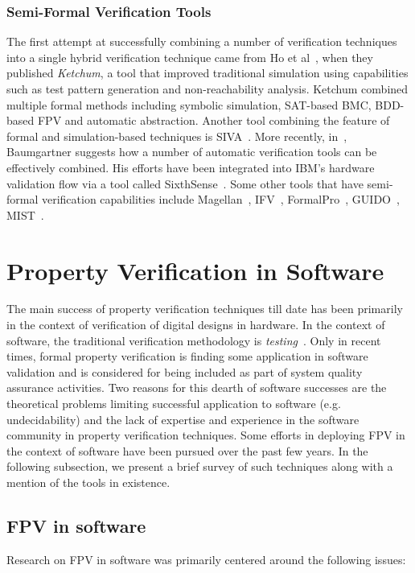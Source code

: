 \subsubsection{Semi-Formal Verification Tools} 
The first attempt at successfully combining a number of verification 
techniques into a single hybrid verification technique came 
from Ho et al~\cite{ho}, when they published {\em Ketchum}, a tool 
that improved traditional simulation using capabilities such as 
test pattern generation and non-reachability analysis. Ketchum combined 
multiple formal methods including symbolic simulation, SAT-based BMC, 
BDD-based FPV and automatic abstraction. Another tool combining the 
feature of formal and simulation-based techniques is SIVA~\cite{ganai:01}. 
More recently, in~\cite{jason:02}, Baumgartner suggests how a number of 
automatic verification tools can be effectively combined. His efforts 
have been integrated into IBM's hardware validation flow via a tool 
called SixthSense~\cite{sixth:85}. Some other tools that have semi-formal 
verification capabilities include Magellan~\cite{magellan}, IFV~\cite{ifv}, 
FormalPro~\cite{formalpro}, GUIDO~\cite{guido}, MIST~\cite{mist}.

\section{Property Verification in Software}
The main success of property verification techniques till date has been 
primarily in the context of verification of digital designs in hardware. 
In the context of software, the traditional verification methodology 
is {\em testing}~\cite{myers:79}. Only in recent times, formal property 
verification is finding some application in software validation and is 
considered for being included as part 
of system quality assurance activities. Two reasons for this dearth of 
software successes are the theoretical problems limiting successful 
application to software (e.g. undecidability) and the lack of expertise 
and experience in the software community in property verification 
techniques. Some efforts in deploying FPV in the context of software have been 
pursued over the past few years. In the following subsection, we present a 
brief survey of such techniques along with a mention of the tools in existence.

\subsection{FPV in software} \label{sec2.5.1}
Research on FPV in software was primarily centered around the following 
issues:

